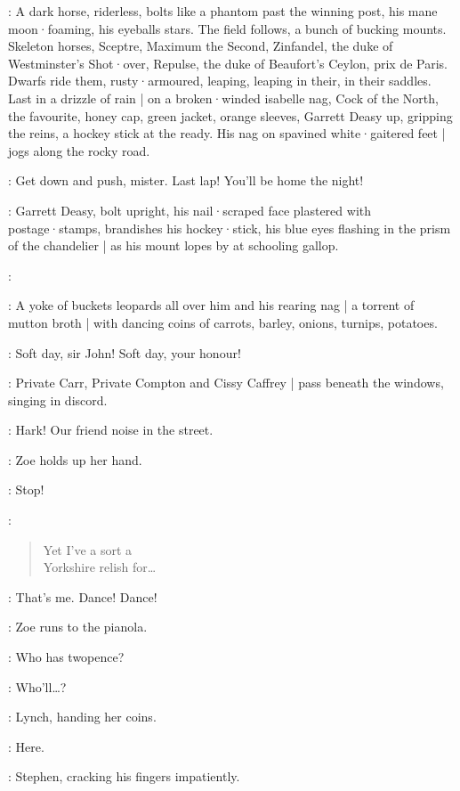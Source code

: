 :
A dark horse,
riderless,
bolts like a phantom past the winning post,
his mane moon·foaming,
his eyeballs stars.
The field follows,
a bunch of bucking mounts.
Skeleton horses,
Sceptre,
Maximum the Second,
Zinfandel,
the duke of Westminster's Shot·over,
Repulse,
the duke of Beaufort's Ceylon,
prix de Paris.
Dwarfs ride them,
rusty·armoured,
leaping,
leaping in their,
in their saddles.
Last in a drizzle of rain |
on a broken·winded isabelle nag,
%
Cock of the North,
the favourite,
honey cap,
green jacket,
orange sleeves,
Garrett Deasy up,
gripping the reins,
a hockey stick at the ready.
His nag on spavined white·gaitered feet |
jogs along the rocky road.

\OrangeLodges[2]:
Get down and push,
mister.
Last lap!
You'll be home the night!

:
Garrett Deasy,
bolt upright,
his nail·scraped face plastered with postage·stamps,
brandishes his hockey·stick,
his blue eyes flashing in the prism of the chandelier |
as his mount lopes by at schooling gallop.

\GarrettDeasy:

:
A yoke of buckets leopards all over him and his rearing nag |
%
a torrent of mutton broth |
with dancing coins
of carrots,
barley,
onions,
turnips,
potatoes.

\GreenLodges[2]:
Soft day,
sir John!
Soft day,
your honour!

:
Private Carr,
Private Compton
and Cissy Caffrey |
pass beneath the windows,
singing in discord.

\Stephen:
Hark!
Our friend noise in the street.

:
Zoe holds up her hand.

\Zoe:
Stop!

\CarrComptonCissy[2]:
\begin{verse}
    Yet I've a sort a\\
    Yorkshire relish for…
\end{verse}

\Zoe:
That's me.
Dance!
Dance!

:
Zoe runs to the pianola.

\Zoe:
Who has twopence?

\Bloom:
Who'll…?

:
Lynch,
handing her coins.

\Lynch:
Here.

:
Stephen,
cracking his fingers impatiently.

